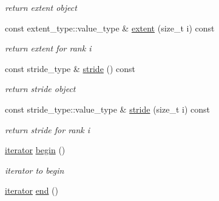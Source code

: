 \begin{DoxyCompactItemize}
\begin{DoxyCompactList}\small\item\em return extent object \item\end{DoxyCompactList}\item 
\hypertarget{classbtas_1_1_tensor_view_ade512be55cad392be6b376d76f6b7ba2}{
const extent\_\-type::value\_\-type \& \hyperlink{classbtas_1_1_tensor_view_ade512be55cad392be6b376d76f6b7ba2}{extent} (size\_\-t i) const }
\label{classbtas_1_1_tensor_view_ade512be55cad392be6b376d76f6b7ba2}

\begin{DoxyCompactList}\small\item\em return extent for rank i \item\end{DoxyCompactList}\item 
\hypertarget{classbtas_1_1_tensor_view_a32e3f3059442ef966cc5454629cfbeb8}{
const stride\_\-type \& \hyperlink{classbtas_1_1_tensor_view_a32e3f3059442ef966cc5454629cfbeb8}{stride} () const }
\label{classbtas_1_1_tensor_view_a32e3f3059442ef966cc5454629cfbeb8}

\begin{DoxyCompactList}\small\item\em return stride object \item\end{DoxyCompactList}\item 
\hypertarget{classbtas_1_1_tensor_view_a9f348a4f2f91375c98da2d6706eedd3f}{
const stride\_\-type::value\_\-type \& \hyperlink{classbtas_1_1_tensor_view_a9f348a4f2f91375c98da2d6706eedd3f}{stride} (size\_\-t i) const }
\label{classbtas_1_1_tensor_view_a9f348a4f2f91375c98da2d6706eedd3f}

\begin{DoxyCompactList}\small\item\em return stride for rank i \item\end{DoxyCompactList}\item 
\hypertarget{classbtas_1_1_tensor_view_a30ec453d2854a90b69641569c781780c}{
\hyperlink{classbtas_1_1_tensor_iterator}{iterator} \hyperlink{classbtas_1_1_tensor_view_a30ec453d2854a90b69641569c781780c}{begin} ()}
\label{classbtas_1_1_tensor_view_a30ec453d2854a90b69641569c781780c}

\begin{DoxyCompactList}\small\item\em iterator to begin \item\end{DoxyCompactList}\item 
\hypertarget{classbtas_1_1_tensor_view_a542e401c9efbeecb66ce4fb93a6d1792}{
\hyperlink{classbtas_1_1_tensor_iterator}{iterator} \hyperlink{classbtas_1_1_tensor_view_a542e401c9efbeecb66ce4fb93a6d1792}{end} ()}
\label{classbtas_1_1_tensor_view_a542e401c9efbeecb66ce4fb93a6d1792}


\end{DoxyCompactItemize}
